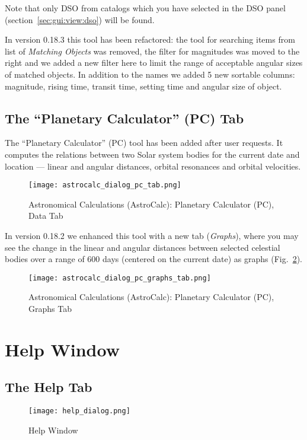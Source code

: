 Note that only DSO from catalogs which you have selected in the DSO panel (section~\ref{sec:gui:view:dso}) will be found.

In version 0.18.3  this tool has been refactored: the tool for searching items from list of \emph{Matching Objects} was removed,
the filter for magnitudes was moved to the right and we added a new filter here to limit the range of acceptable angular sizes of matched objects.
In addition to the names we added 5 new sortable columns: magnitude, rising time, transit time, setting time and angular size of object.


\subsection{The ``Planetary Calculator'' (PC) Tab}
\label{sec:gui:AstroCalc:PC}

The ``Planetary Calculator'' (PC) tool has been added after user requests. 
It computes the relations between two Solar system bodies for the current date and location --- linear and angular distances, 
orbital resonances and orbital velocities.

\begin{figure}[htbp]
\centering\texttt{[image: astrocalc\_dialog\_pc\_tab.png]}
\caption{Astronomical Calculations (AstroCalc): Planetary Calculator (PC), Data Tab}
\label{fig:gui:AstroCalc:PC:Data}
\end{figure}

In version 0.18.2  we enhanced this tool with a new tab (\emph{Graphs}),
where you may see the change in the linear and angular distances between selected celestial bodies
over a range of 600 days (centered on the current date) as graphs (Fig.~\ref{fig:gui:AstroCalc:PC:Graphs}).

\begin{figure}[htbp]
\centering\texttt{[image: astrocalc\_dialog\_pc\_graphs\_tab.png]}
\caption{Astronomical Calculations (AstroCalc): Planetary Calculator (PC), Graphs Tab}
\label{fig:gui:AstroCalc:PC:Graphs}
\end{figure}


\newpage 
   
\section{Help Window}
\label{sec:gui:help}

\subsection{The Help Tab}
\label{sec:gui:help:help}
\begin{figure}[htbp]
\centering\texttt{[image: help\_dialog.png]}
\caption{Help Window}
\label{fig:gui:help}
\end{figure}

